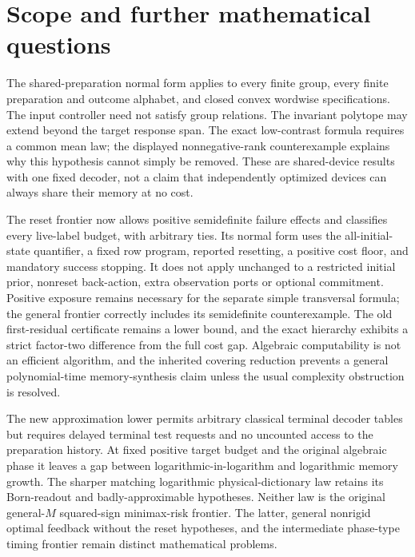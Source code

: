\section{Scope and further mathematical questions}
\label{sec:r73-scope}\label{sec:r74-scope}\label{sec:r75-scope}\label{sec:r76-scope}\label{sec:r77-scope}\label{sec:r78-scope}
The shared-preparation normal form applies to every finite group, every
finite preparation and outcome alphabet, and closed convex wordwise
specifications.  The input controller need not satisfy group relations.
The invariant polytope may extend beyond the target response span.
The exact low-contrast formula requires a common mean law; the displayed
nonnegative-rank counterexample explains why this hypothesis cannot
simply be removed.  These are shared-device results with one fixed
decoder, not a claim that independently optimized devices can always
share their memory at no cost.

The reset frontier now allows positive semidefinite failure effects
and classifies every live-label budget, with arbitrary ties.  Its normal
form uses the all-initial-state quantifier, a fixed row program, reported
resetting, a positive cost floor, and mandatory success stopping.  It
does not apply unchanged to a restricted initial prior, nonreset
back-action, extra observation ports or optional commitment.  Positive
exposure remains necessary for the separate simple transversal formula;
the general frontier correctly includes its semidefinite counterexample.
The old first-residual certificate remains a lower bound, and the exact
hierarchy exhibits a strict factor-two difference from the full cost gap.
Algebraic computability is not an efficient algorithm, and the inherited
covering reduction prevents a general polynomial-time memory-synthesis
claim unless the usual complexity obstruction is resolved.

The new approximation lower permits arbitrary classical terminal
decoder tables but requires delayed terminal test requests and no
uncounted access to the preparation history.  At fixed positive target
budget and the original algebraic phase it leaves a gap between
logarithmic-in-logarithm and logarithmic memory growth.  The sharper
matching logarithmic physical-dictionary law retains its Born-readout
and badly-approximable hypotheses.  Neither law is the original
general-$M$ squared-sign minimax-risk frontier.  The latter, general
nonrigid optimal feedback without the reset hypotheses,
and the intermediate phase-type timing frontier remain distinct
mathematical problems.

